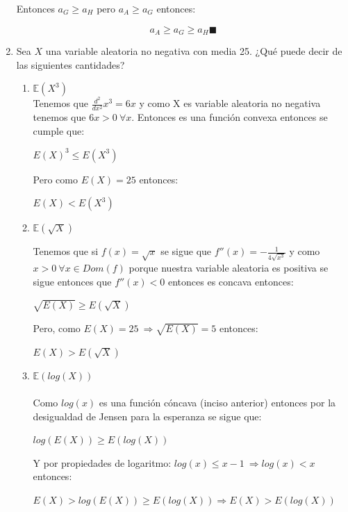 \documentclass[12pt,a4paper]{report}
\begin{document}
\begin{enumerate}
{\begin{center}
		      \end{center}
		      Entonces $a_{G}\geq a_{H}$ pero $a_{A}\geq a_{G}$ entonces:\\
		      \begin{center}
		          $$a_{A}\geq a_{G} \geq a_{H} {\blacksquare}$$
		      \end{center}

 		}

		\item{
			Sea $X$ una variable aleatoria no negativa con media 25. ¿Qué puede
			decir de las siguientes cantidades?
			\begin{enumerate}
				\item {
					$\mathbb{E}(X^3)$ \\

				Tenemos que $\frac{d^2}{dx^2}x^3=6x$ y como X es variable aleatoria no negativa tenemos que $6x>0 \ \forall x$. Entonces es una función convexa entonces se cumple que:\\
				\begin{center}
				    $E(X)^3 \leq E(X^3)$
				\end{center}
				Pero como $E(X)=25$ entonces:\\
				\begin{center}
				    $E(X)< E(X^3)$
				\end{center}

				}


				\item {
					$\mathbb{E}(\sqrt{X})$

				Tenemos que si $f(x)=\sqrt{x}$ se sigue que $f''(x)=-\frac{1}{4\sqrt{x^3}}$ y como $x>0 \ \forall x\in Dom(f)$ porque nuestra variable aleatoria es positiva se sigue entonces que $f''(x)<0$ entonces es concava entonces:\\
				\begin{center}
				    $\sqrt{E(X)}\geq E(\sqrt{X})$
				\end{center}
				Pero, como $E(X)=25 \ \Rightarrow \sqrt{E(X)}=5$ entonces:\\
				\begin{center}
				    $E(X) > E(\sqrt{X})$
				\end{center}

				}

				\item {
					$\mathbb{E}(log(X))$\\ \\
					Como $log(x)$ es una función cóncava (inciso anterior) entonces por la desigualdad de Jensen para la esperanza se sigue que:\\
					\begin{center}
					    $log(E(X))\geq E(log(X))$
					\end{center}
					Y por propiedades de logaritmo: $log(x)\leq x-1 \ \Rightarrow log(x) < x$ entonces:\\
					\begin{center}
					    $E(X)> log(E(X)) \geq E(log(X)) \Rightarrow E(X) > E(log(X))$
					\end{center}
				}


\end{enumerate}}
\end{enumerate}
\end{document}
